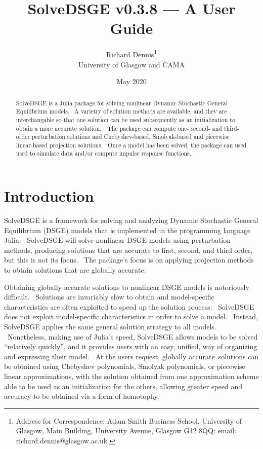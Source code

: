 \documentclass[notitlepage,11pt]{article}
\begin{document}
\author{Richard Dennis\thanks{%
Address for Correspondence: Adam Smith Business School, University of
Glasgow, Main Building, University Avenue, Glasgow G12 8QQ; email:
richard.dennis@glasgow.ac.uk.} \\
University of Glasgow and CAMA}
\title{SolveDSGE v0.3.8 --- A User Guide}
\date{May 2020}
\maketitle

\begin{abstract}
SolveDSGE is a Julia package for solving nonlinear Dynamic Stochastic
General Equilibrium models. \ A varietry of solution methods are available,
and they are interchangable so that one solution can be used subsequently as
an initialization to obtain a more accurate solution.\noindent\ \ The
package can compute one- second- and third-order perturbation solutions and
Chebyshev-based, Smolyak-based and piecewise linear-based projection
solutions. \ Once a model has been solved, the package can used used to
simulate data and/or compute impulse response functions.

\vspace{0.12in}
\end{abstract}

\thispagestyle{empty}\newpage \setlength{\baselineskip}{18.95pt}%
\setcounter{page}{1}

\section{Introduction}

SolveDSGE is a framework for solving and analyzing Dynamic Stochastic
General Equilibrium (DSGE) models that is implemented in the programming
language Julia. \ SolveDSGE will solve nonlinear DSGE models using
perturbation methods, producing solutions that are accurate to first,
second, and third order, but this is not its focus. \ The package's focus is
on applying projection methods to obtain solutions that are globally
accurate.

Obtaining globally accurate solutions to nonlinear DSGE models is
notoriously difficult. \ Solutions are invariably slow to obtain and
model-specific characteristics are often exploited to speed up the solution
process. \ SolveDSGE does not exploit model-specific characteristics in
order to solve a model. \ Instead, SolveDSGE applies the same general
solution strategy to all models. \ Nonetheless, making use of Julia's speed,
SolveDSGE allows models to be solved \textquotedblleft relatively
quickly\textquotedblright , and it provides users with an easy, unified, way
of organizing and expressing their model. \ At the users request, globally
accurate\ solutions can be obtained using Chebyshev polynomials, Smolyak
polynomials, or piecewise linear approximations, with the solution obtained
from one approximation scheme able to be used as an initialization for the
others, allowing greater speed and accuracy to be obtained via a form of
homotophy.
\end{document}
